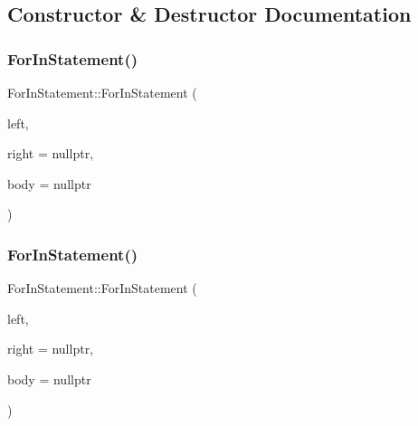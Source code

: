 \subsection{Constructor \& Destructor Documentation}
\mbox{\label{struct_for_in_statement_aa3565db4851cca290147f4d98b275c68}} 
\subsubsection{\texorpdfstring{For\+In\+Statement()}{ForInStatement()}\hspace{0.1cm}{\footnotesize\ttfamily [1/2]}}
{\footnotesize\ttfamily For\+In\+Statement\+::\+For\+In\+Statement (\begin{DoxyParamCaption}\item[{\hyperlink{struct_left_hand_side_expression}{Left\+Hand\+Side\+Expression} $\ast$}]{left,  }\item[{\hyperlink{struct_expression}{Expression} $\ast$}]{right = {\ttfamily nullptr},  }\item[{\hyperlink{struct_statement}{Statement} $\ast$}]{body = {\ttfamily nullptr} }\end{DoxyParamCaption})\hspace{0.3cm}{\ttfamily [inline]}}

\mbox{\label{struct_for_in_statement_aa78680c185913cd46be68a67cbe43b27}} 
\subsubsection{\texorpdfstring{For\+In\+Statement()}{ForInStatement()}\hspace{0.1cm}{\footnotesize\ttfamily [2/2]}}
{\footnotesize\ttfamily For\+In\+Statement\+::\+For\+In\+Statement (\begin{DoxyParamCaption}\item[{\hyperlink{struct_variable_declaration}{Variable\+Declaration} $\ast$}]{left,  }\item[{\hyperlink{struct_expression}{Expression} $\ast$}]{right = {\ttfamily nullptr},  }\item[{\hyperlink{struct_statement}{Statement} $\ast$}]{body = {\ttfamily nullptr} }\end{DoxyParamCaption})\hspace{0.3cm}{\ttfamily [inline]}}



